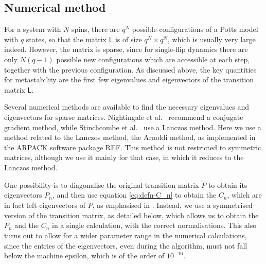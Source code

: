 \documentclass[10pt]{article}
\newcommand{\J}[2]{J(#1, #2)}
\newcommand{\tP}{\tilde{P}}
\newcommand{\LL}{\mathsf{L}}
\begin{document}
% 




\subsection{Numerical method}

For a system with $N$ spins, there are $q^N$ possible configurations of a Potts
model with $q$ states, so that the matrix $\LL$ is of size $q^N \times
q^N$, which is usually very large indeed.  However, the matrix is sparse,
since for single-flip dynamics there are only $N(q-1)$ possible new configurations which are accessible 
at each step, together with the previous configuration.
As discussed above, the key quantities for  metastability are the
first few eigenvalues and eigenvectors of the transition matrix $\LL$.

Several numerical methods are available to find the
necessary eigenvalues and eigenvectors for sparse matrices. Nightingale et al.\
\cite{NightingaleComputationDominantEigenvaluesEigenvectorsPRB1993,
NightingaleCorrelationTimesCriticalityPRB2000}
recommend a conjugate gradient method, while Stinchcombe et al.\
\cite{StinchcombeNucleationtimesKineticIsingPRE2005} use a Lanczos method.
Here we use a method related to the Lanczos method, the Arnoldi method, as
implemented in the ARPACK software package REF. This method is not restricted to
symmetric matrices, although we use it mainly for that case, in which it
reduces to the Lanczos method.



One possibility is to diagonalise the original transition matrix $\tP$ to
obtain its eigenvectors $P_n$, and then use equation
\eqref{eq:defn-C_n} to obtain the $C_n$, which are in fact
left eigenvectors of $\tP$, as emphasised in
 \cite{GaveauSchulmanJMP1998,GaveauSchulmanMultiplePhasesPRE2006}.  
% 
Instead, we use a symmetrised version of the transition matrix, as detailed
below, which allows us to obtain the $P_n$ and the $C_n$ in a
single
calculation, with the correct normalisations. This also turns out to
allow for a wider parameter range in the numerical
calculations, since the entries of the eigenvectors, even during the algorithm, must not fall below the
machine epsilon, which is of the order of $10^{-16}$.
\end{document}
